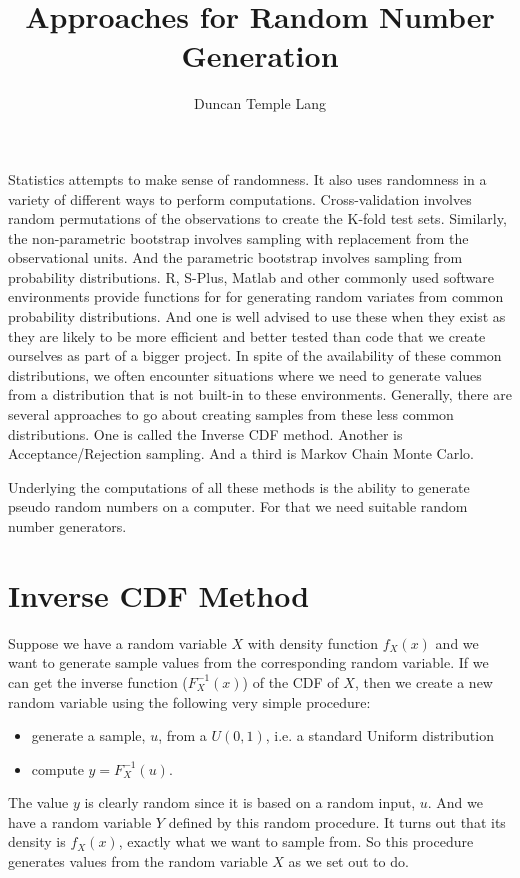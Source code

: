 \documentclass{article}
\author{Duncan Temple Lang}
\title{Approaches for Random Number Generation}
\begin{document}
\maketitle

Statistics attempts to make sense of randomness.  It also uses
randomness in a variety of different ways to perform computations.
Cross-validation involves random permutations of the observations to
create the K-fold test sets.  Similarly, the non-parametric bootstrap
involves sampling with replacement from the observational units.  And
the parametric bootstrap involves sampling from probability
distributions.  R, S-Plus, Matlab and other commonly used software
environments provide functions for for generating random variates from
common probability distributions.  And one is well advised to use
these when they exist as they are likely to be more efficient and
better tested than code that we create ourselves as part of a bigger
project.  In spite of the availability of these common distributions,
we often encounter situations where we need to generate values from a
distribution that is not built-in to these environments.  Generally,
there are several approaches to go about creating samples from these
less common distributions.  One is called the Inverse CDF method.
Another is Acceptance/Rejection sampling.  And a third is Markov Chain
Monte Carlo.

Underlying the computations of all these methods is the ability to
generate pseudo random numbers on a computer. For that we need
suitable random number generators.



\section{Inverse CDF Method}

Suppose we have a random variable $X$ with density function $f_X(x)$
and we want to generate sample values from the corresponding random
variable.  If we can get the inverse function ($F_X^{-1}(x)$) of the
CDF of $X$, then we create a new random variable using the following very
simple procedure:
\begin{itemize}
\item generate a sample, $u$,  from a $U(0, 1)$, i.e. a
 standard Uniform distribution
\item compute $y = F_X^{-1}(u)$.
\end{itemize}
The value $y$ is clearly random since it is based on a random input,
$u$.  And we have a random variable $Y$ defined by this random
procedure.  It turns out that its density is $f_X(x)$, exactly what we
want to sample from. So this procedure generates values from the
random variable $X$ as we set out to do.
\end{document}
